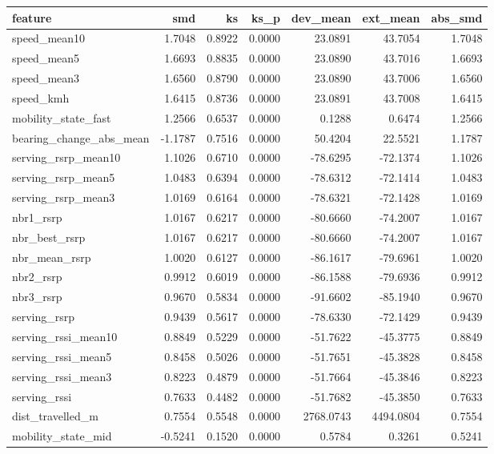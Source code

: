 \begin{tabular}{lrrrrrr}
\toprule
feature & smd & ks & ks\_p & dev\_mean & ext\_mean & abs\_smd \\
\midrule
speed\_mean10 & 1.7048 & 0.8922 & 0.0000 & 23.0891 & 43.7054 & 1.7048 \\
speed\_mean5 & 1.6693 & 0.8835 & 0.0000 & 23.0890 & 43.7016 & 1.6693 \\
speed\_mean3 & 1.6560 & 0.8790 & 0.0000 & 23.0890 & 43.7006 & 1.6560 \\
speed\_kmh & 1.6415 & 0.8736 & 0.0000 & 23.0891 & 43.7008 & 1.6415 \\
mobility\_state\_fast & 1.2566 & 0.6537 & 0.0000 & 0.1288 & 0.6474 & 1.2566 \\
bearing\_change\_abs\_mean & -1.1787 & 0.7516 & 0.0000 & 50.4204 & 22.5521 & 1.1787 \\
serving\_rsrp\_mean10 & 1.1026 & 0.6710 & 0.0000 & -78.6295 & -72.1374 & 1.1026 \\
serving\_rsrp\_mean5 & 1.0483 & 0.6394 & 0.0000 & -78.6312 & -72.1414 & 1.0483 \\
serving\_rsrp\_mean3 & 1.0169 & 0.6164 & 0.0000 & -78.6321 & -72.1428 & 1.0169 \\
nbr1\_rsrp & 1.0167 & 0.6217 & 0.0000 & -80.6660 & -74.2007 & 1.0167 \\
nbr\_best\_rsrp & 1.0167 & 0.6217 & 0.0000 & -80.6660 & -74.2007 & 1.0167 \\
nbr\_mean\_rsrp & 1.0020 & 0.6127 & 0.0000 & -86.1617 & -79.6961 & 1.0020 \\
nbr2\_rsrp & 0.9912 & 0.6019 & 0.0000 & -86.1588 & -79.6936 & 0.9912 \\
nbr3\_rsrp & 0.9670 & 0.5834 & 0.0000 & -91.6602 & -85.1940 & 0.9670 \\
serving\_rsrp & 0.9439 & 0.5617 & 0.0000 & -78.6330 & -72.1429 & 0.9439 \\
serving\_rssi\_mean10 & 0.8849 & 0.5229 & 0.0000 & -51.7622 & -45.3775 & 0.8849 \\
serving\_rssi\_mean5 & 0.8458 & 0.5026 & 0.0000 & -51.7651 & -45.3828 & 0.8458 \\
serving\_rssi\_mean3 & 0.8223 & 0.4879 & 0.0000 & -51.7664 & -45.3846 & 0.8223 \\
serving\_rssi & 0.7633 & 0.4482 & 0.0000 & -51.7682 & -45.3850 & 0.7633 \\
dist\_travelled\_m & 0.7554 & 0.5548 & 0.0000 & 2768.0743 & 4494.0804 & 0.7554 \\
mobility\_state\_mid & -0.5241 & 0.1520 & 0.0000 & 0.5784 & 0.3261 & 0.5241 \\

\end{tabular}
